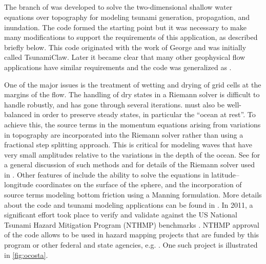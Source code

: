 %
%
%

\subsection{\geoclaw}

The \geoclaw branch of \clawpack was developed to solve the
two-dimensional shallow water equations over topography
for modeling tsunami generation, propagation, and inundation.
The \amrclaw code formed the starting point but it was necessary to make many
modifications to support the requirements of this application, as described
briefly below.  This code originated with the work of George
\cite{dgeorge:masters, dgeorge:phd, dgeorge:jcp}
and was initially called
{\sc TsunamiClaw}.  Later it became clear that many other
geophysical flow applications have similar requirements and the code was
generalized as \geoclaw.


One of the major issues is the treatment of wetting and
drying of grid cells at the margins of the flow. The handling of dry
states in a Riemann solver is difficult to handle robustly, and has gone
through several iterations.
\geoclaw must also be well-balanced in order to preserve steady states, in
particular the ``ocean at rest''.
To achieve this, the source terms in the momentum equations arising from
variations in topography are incorporated into the Riemann solver rather than
using a fractional step splitting approach. This is critical for modeling
waves that have very small amplitudes relative to the variations in the depth
of the ocean.  
See \cite{rjl:wbfwave10} for a general discussion of such methods and 
\cite{dgeorge:phd, dgeorge:jcp} for details of the Riemann solver used in
\geoclaw.  Other features of
\geoclaw include the ability to solve the equations in latitude--longitude
coordinates on the surface of the sphere, and the incorporation of source terms
modeling bottom friction using a Manning formulation. More details about the
code and tsunami modeling applications can be found in
\cite{BergerGeorgeLeVequeMandli:awr11, LeVequeGeorgeBerger:an11}. In 2011, a
significant effort took place to verify and validate \geoclaw against the US
National Tsunami Hazard Mitigation Program (NTHMP) benchmarks
\cite{GonzalezLeVequeEtAl2011}.
NTHMP approval of the code allows \geoclaw to be used in hazard mapping
projects that are funded by this program or other federal and state agencies,
e.g.
\cite{GonzalezLeVequeEtAl2013a,GonzalezLeVequeEtAl2014}.
One such project is illustrated in \cref{fig:ocosta}.

